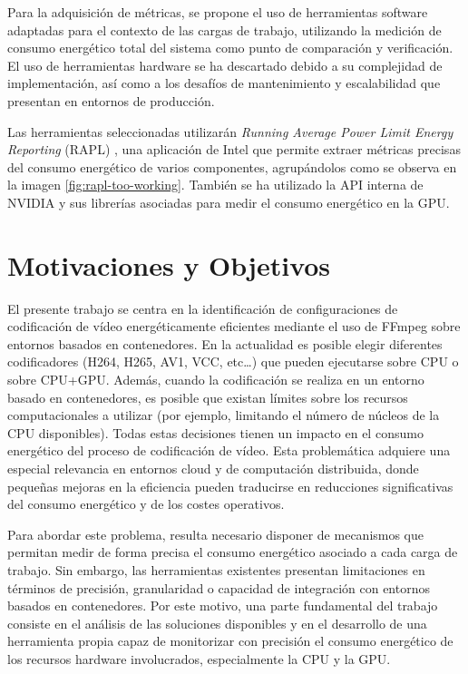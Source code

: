 Para la adquisición de métricas, se propone el uso de herramientas software adaptadas para el contexto de las cargas de trabajo, utilizando la medición de consumo energético total del sistema como punto de comparación y verificación. El uso de herramientas hardware se ha descartado debido a su complejidad de implementación, así como a los desafíos de mantenimiento y escalabilidad que presentan en entornos de producción.

Las herramientas seleccionadas utilizarán \textit{Running Average Power Limit Energy Reporting} (RAPL) \cite{rapl-tool}, una aplicación de Intel que permite extraer métricas precisas del consumo energético de varios componentes, agrupándolos como se observa en la imagen \ref{fig:rapl-too-working}. También se ha utilizado la API interna de NVIDIA y sus librerías asociadas para medir el consumo energético en la GPU. 

\section{Motivaciones y Objetivos}
El presente trabajo se centra en la identificación de configuraciones de codificación de vídeo energéticamente eficientes mediante el uso de FFmpeg sobre entornos basados en contenedores. En la actualidad es posible elegir diferentes codificadores (H264, H265, AV1, VCC, etc…) que pueden ejecutarse sobre CPU o sobre CPU+GPU. Además, cuando la codificación se realiza en un entorno basado en contenedores, es posible que existan límites sobre los recursos computacionales a utilizar (por ejemplo, limitando el número de núcleos de la CPU disponibles). Todas estas decisiones tienen un impacto en el consumo energético del proceso de codificación de vídeo. Esta problemática adquiere una especial relevancia en entornos cloud y de computación distribuida, donde pequeñas mejoras en la eficiencia pueden traducirse en reducciones significativas del consumo energético y de los costes operativos.

Para abordar este problema, resulta necesario disponer de mecanismos que permitan medir de forma precisa el consumo energético asociado a cada carga de trabajo. Sin embargo, las herramientas existentes presentan limitaciones en términos de precisión, granularidad o capacidad de integración con entornos basados en contenedores. Por este motivo, una parte fundamental del trabajo consiste en el análisis de las soluciones disponibles y en el desarrollo de una herramienta propia capaz de monitorizar con precisión el consumo energético de los recursos hardware involucrados, especialmente la CPU y la GPU.

